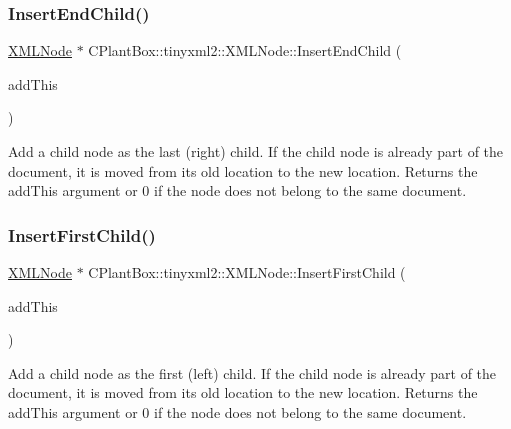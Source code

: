 \subsubsection{\texorpdfstring{Insert\+End\+Child()}{InsertEndChild()}}
{\footnotesize\ttfamily \hyperlink{classCPlantBox_1_1tinyxml2_1_1XMLNode}{X\+M\+L\+Node} $\ast$ C\+Plant\+Box\+::tinyxml2\+::\+X\+M\+L\+Node\+::\+Insert\+End\+Child (\begin{DoxyParamCaption}\item[{\hyperlink{classCPlantBox_1_1tinyxml2_1_1XMLNode}{X\+M\+L\+Node} $\ast$}]{add\+This }\end{DoxyParamCaption})}

Add a child node as the last (right) child. If the child node is already part of the document, it is moved from its old location to the new location. Returns the add\+This argument or 0 if the node does not belong to the same document. \mbox{\label{classCPlantBox_1_1tinyxml2_1_1XMLNode_af88f5f593246fd9d78eedfe2fbebe7b4}} 
\subsubsection{\texorpdfstring{Insert\+First\+Child()}{InsertFirstChild()}}
{\footnotesize\ttfamily \hyperlink{classCPlantBox_1_1tinyxml2_1_1XMLNode}{X\+M\+L\+Node} $\ast$ C\+Plant\+Box\+::tinyxml2\+::\+X\+M\+L\+Node\+::\+Insert\+First\+Child (\begin{DoxyParamCaption}\item[{\hyperlink{classCPlantBox_1_1tinyxml2_1_1XMLNode}{X\+M\+L\+Node} $\ast$}]{add\+This }\end{DoxyParamCaption})}

Add a child node as the first (left) child. If the child node is already part of the document, it is moved from its old location to the new location. Returns the add\+This argument or 0 if the node does not belong to the same document. \mbox{\label{classCPlantBox_1_1tinyxml2_1_1XMLNode_a50ef5d07c0fcf536871b7296f6d77518}} 
